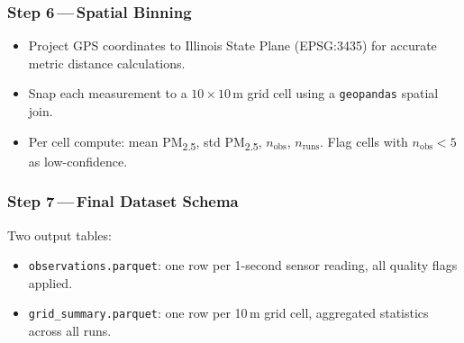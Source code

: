 \documentclass[11pt, letterpaper]{article}
\begin{document}
\subsubsection{Step 6\,---\,Spatial Binning}
\begin{itemize}
  \item Project GPS coordinates to Illinois State Plane (EPSG:3435) for accurate metric distance calculations.
  \item Snap each measurement to a $10 \times 10$\,m grid cell using a \texttt{geopandas} spatial join.
  \item Per cell compute: mean PM\textsubscript{2.5}, std PM\textsubscript{2.5}, $n_\text{obs}$, $n_\text{runs}$. Flag cells with $n_\text{obs} < 5$ as low-confidence.
\end{itemize}

\subsubsection{Step 7\,---\,Final Dataset Schema}

Two output tables:
\begin{itemize}
  \item \texttt{observations.parquet}: one row per 1-second sensor reading, all quality flags applied.
  \item \texttt{grid\_summary.parquet}: one row per 10\,m grid cell, aggregated statistics across all runs.
\end{itemize}
\end{document}
